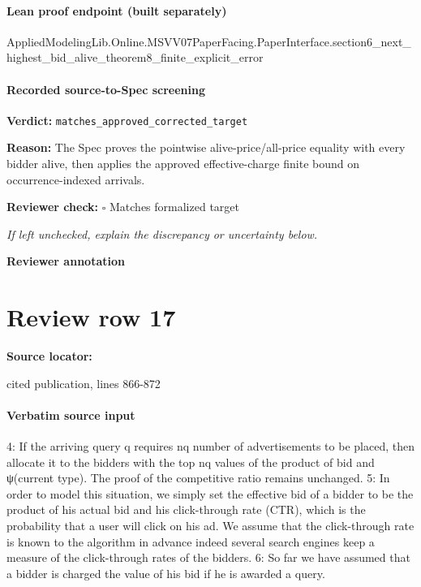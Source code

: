 \documentclass[10pt]{article}
\newcommand{\reviewerbox}{%
  \par\noindent\fbox{\parbox{0.96\linewidth}{\rule{0pt}{0.38in}}}\par
}
\newcommand{\reviewmatch}[1]{%
  \par\noindent\textbf{Reviewer check:} $\square$\; #1\par
  \noindent\emph{If left unchecked, explain the discrepancy or uncertainty below.}\par
}
\begin{document}
\paragraph{Lean proof endpoint (built separately)}\begin{ReviewVerbatim}
AppliedModelingLib.Online.MSVV07PaperFacing.PaperInterface.section6_next_highest_bid_alive_theorem8_finite_explicit_error
\end{ReviewVerbatim}

\paragraph{Recorded source-to-Spec screening}
\textbf{Verdict:} \texttt{matches\_approved\_corrected\_target}
\\
{\raggedright
\textbf{Reason:} The Spec proves the pointwise alive-\allowbreak{}price/\allowbreak{}all-\allowbreak{}price equality with every bidder alive, then applies the approved effective-\allowbreak{}charge finite bound on occurrence-\allowbreak{}indexed arrivals.\allowbreak{}
\par}
\reviewmatch{Matches formalized target}
\noindent\textbf{Reviewer annotation}\par
\reviewerbox
\clearpage
\hypertarget{source-claim-73ca4103d136519f}{}
\section*{Review row 17}
\textbf{Source locator:} {\footnotesize\raggedright cited publication, lines 866-\allowbreak{}872\par}
\paragraph{Verbatim source input}
\begin{ReviewVerbatim}
4: If the arriving query q requires nq number of advertisements to be placed, then allocate it
to the bidders with the top nq values of the product of bid and ψ(current type). The proof of
the competitive ratio remains unchanged.
5: In order to model this situation, we simply set the effective bid of a bidder to be the product
of his actual bid and his click-through rate (CTR), which is the probability that a user will
click on his ad. We assume that the click-through rate is known to the algorithm in advance indeed several search engines keep a measure of the click-through rates of the bidders.
6: So far we have assumed that a bidder is charged the value of his bid if he is awarded a query.
\end{ReviewVerbatim}
\end{document}
